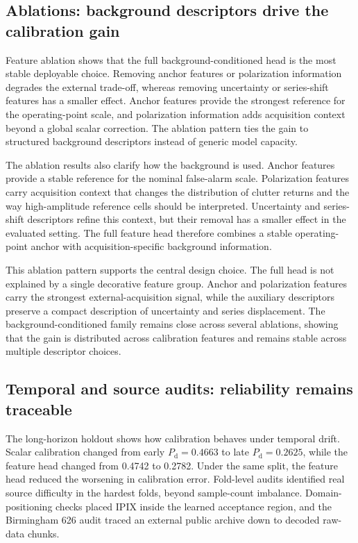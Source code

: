 \documentclass[preprint,12pt]{elsarticle}
\begin{document}
\subsection{Ablations: background descriptors drive the calibration gain}
\label{subsec:ablation-results}

Feature ablation shows that the full background-conditioned head is the most
stable deployable choice. Removing anchor features or polarization information
degrades the external trade-off, whereas removing uncertainty or series-shift
features has a smaller effect. Anchor features provide the strongest reference
for the operating-point scale, and polarization information adds acquisition
context beyond a global scalar correction. The ablation pattern ties the gain to
structured background descriptors instead of generic model capacity.

The ablation results also clarify how the background is used. Anchor features
provide a stable reference for the nominal false-alarm scale. Polarization
features carry acquisition context that changes the distribution of clutter
returns and the way high-amplitude reference cells should be interpreted.
Uncertainty and series-shift descriptors refine this context, but their removal
has a smaller effect in the evaluated setting. The full feature head therefore
combines a stable operating-point anchor with acquisition-specific background
information.

This ablation pattern supports the central design choice. The full head is not
explained by a single decorative feature group. Anchor and polarization features
carry the strongest external-acquisition signal, while the auxiliary descriptors
preserve a compact description of uncertainty and series displacement. The
background-conditioned family remains close across several ablations, showing
that the gain is distributed across calibration features and remains stable
across multiple descriptor choices.

\subsection{Temporal and source audits: reliability remains traceable}
\label{subsec:boundary-results}

The long-horizon holdout shows how calibration behaves under temporal drift.
Scalar calibration changed from early $P_{\mathrm{d}}=0.4663$ to late
$P_{\mathrm{d}}=0.2625$, while the feature head changed from 0.4742 to 0.2782.
Under the same split, the feature head reduced the worsening in calibration
error. Fold-level audits identified real source difficulty in the hardest folds,
beyond sample-count imbalance. Domain-positioning checks placed IPIX inside the
learned acceptance region, and the Birmingham 626 audit traced an external
public archive down to decoded raw-data chunks.
\end{document}
